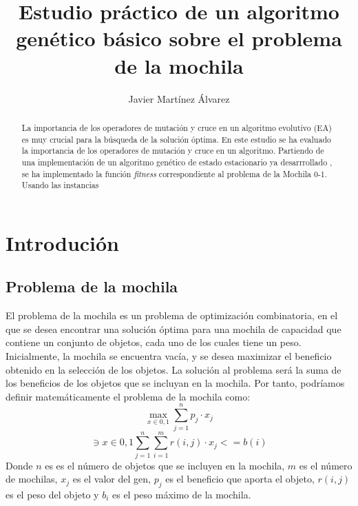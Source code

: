\documentclass[runningheads]{llncs}
\begin{document}
%
\title{Estudio práctico de un algoritmo genético básico sobre el problema de la mochila}
%
%
\author{Javier Martínez Álvarez}
%
%
%
\maketitle              %
%
\begin{abstract}
    La importancia de los operadores de mutación y cruce en un algoritmo evolutivo (EA)
    es muy crucial para la búsqueda de la solución óptima. En este estudio se ha
    evaluado la importancia de los operadores de mutación y cruce en un algoritmo. Partiendo de 
    una implementación de un algoritmo genético de estado estacionario ya desarrrollado \cite{ref_ssga}, 
    se ha implementado la función \textit{fitness} correspondiente al problema de la Mochila 0-1.
    Usando las instancias

\end{abstract}
%
%
%
\section{Introdución}
\subsection{Problema de la mochila}
El problema de la mochila es un problema de optimización combinatoria, en el que se desea
encontrar una solución óptima para una mochila de capacidad que contiene un conjunto de
objetos, cada uno de los cuales tiene un peso.\\
Inicialmente, la mochila se encuentra vacía, y se desea maximizar el beneficio obtenido
en la selección de los objetos. La solución al problema será la suma de los beneficios de los objetos
que se incluyan en la mochila.
Por tanto, podríamos definir matemáticamente el problema de la mochila como:
\begin{equation}
    \max_{x \in {0, 1}} \sum_{j=1}^n p_j \cdot x_j
\end{equation}
\begin{equation}
    \ni {x \in {0, 1}} \sum_{j=1}^n \sum_{i=1}^m r(i,j) \cdot x_j <= b(i)
\end{equation}
Donde $n$ es es el número de objetos que se incluyen en la mochila, $m$ es el número de mochilas, $x_j$ es el valor del gen, 
$p_j$ es el beneficio que aporta el objeto, $r(i,j)$ es el peso del objeto y $b_i$ es el peso máximo de la mochila.
\end{document}
